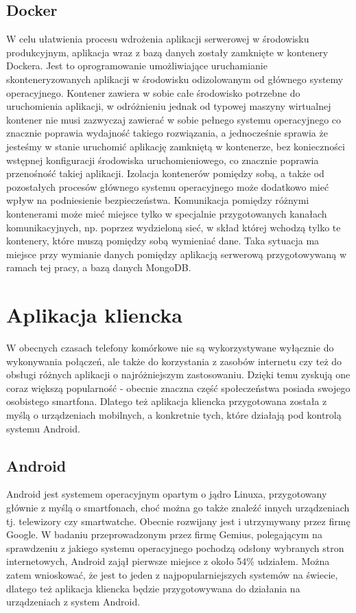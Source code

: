 \documentclass[a4paper,12pt,twoside,openany]{report}
\begin{document}
\subsection{Docker}
W celu ułatwienia procesu wdrożenia aplikacji serwerowej w środowisku produkcyjnym, aplikacja wraz z bazą danych zostały zamknięte w kontenery Dockera. Jest to oprogramowanie  umożliwiające uruchamianie skonteneryzowanych aplikacji w środowisku odizolowanym od głównego systemy operacyjnego. Kontener zawiera w sobie całe środowisko potrzebne do uruchomienia aplikacji, w odróżnieniu jednak od typowej maszyny wirtualnej kontener nie musi zazwyczaj zawierać w sobie pełnego systemu operacyjnego co znacznie poprawia wydajność takiego rozwiązania, a jednocześnie sprawia że jesteśmy w stanie uruchomić aplikację zamkniętą w kontenerze, bez konieczności wstępnej konfiguracji środowiska uruchomieniowego, co znacznie poprawia przenośność takiej aplikacji. Izolacja kontenerów pomiędzy sobą, a także od pozostałych procesów głównego systemu operacyjnego może dodatkowo mieć wpływ na podniesienie bezpieczeństwa. Komunikacja pomiędzy różnymi kontenerami może mieć miejsce tylko w specjalnie przygotowanych kanałach komunikacyjnych, np. poprzez wydzieloną sieć, w skład której wchodzą tylko te kontenery, które muszą pomiędzy sobą wymieniać dane. Taka sytuacja ma miejsce przy wymianie danych pomiędzy aplikacją serwerową przygotowywaną w ramach tej pracy, a bazą danych MongoDB.


\section{Aplikacja kliencka}
W obecnych czasach telefony komórkowe nie są wykorzystywane wyłącznie do wykonywania połączeń, ale także do korzystania z zasobów internetu czy też do obsługi różnych aplikacji o najróżniejszym zastosowaniu. Dzięki temu zyskują one coraz większą popularność - obecnie znaczna część społeczeństwa posiada swojego osobistego smartfona. Dlatego też aplikacja kliencka przygotowana została z myślą o urządzeniach mobilnych, a konkretnie tych, które działają pod kontrolą systemu Android. 

\subsection{Android}
Android jest systemem operacyjnym opartym o jądro Linuxa, przygotowany głównie z myślą o smartfonach, choć można go także znaleźć innych urządzeniach tj. telewizory czy smartwatche. Obecnie rozwijany jest i utrzymywany przez firmę Google. W badaniu przeprowadzonym przez firmę Gemius, polegającym na sprawdzeniu z jakiego systemu operacyjnego pochodzą odsłony wybranych stron internetowych, Android zajął pierwsze miejsce z około 54\% udziałem. Można zatem wnioskować, że jest to jeden z najpopularniejszych systemów na świecie, dlatego też aplikacja kliencka będzie przygotowywana do działania na urządzeniach z system Android. 
 
\end{document}
